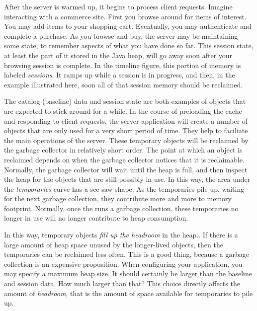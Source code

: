 After the server is warmed up, it begins to process client requests. Imagine
interacting with a commerce site. First you browse around for items of
interest. You may add items to your shopping cart. Eventually, you may
authenticate and complete a purchase. 
As you browse and buy, the server may be maintaining some
state, to remember aspects of what you have done so far. This
session state, at least the part of it stored in the Java heap, will go away
soon after your browsing session is complete. In the timeline figure, this
portion of memory is labeled \emph{sessions}. It ramps up while a session is in
progress, and then, in the example illustrated here, soon all of that session
memory should be reclaimed.

The catalog (baseline) data and session state are both examples of objects that
are expected to stick around for a while.
 In the course of preloading the cache
and responding to client requests, the server application will create a number
of objects that are only used for a very short period of time. They help to
faciliate the main operations of the server.
These temporary objects will be reclaimed by the \jres garbage collector in
relatively short order. The point at which an object is reclaimed depends on when the garbage collector
notices that it is reclaimable. Normally, the garbage collector will wait until
the heap is full, and then inspect the heap for the objects that are still
possibly in use. In this way, the area under the \emph{temporaries} curve has a
see-saw shape. As the temporaries pile up, waiting for the next garbage
collection, they contribute more and more to memory footprint. Normally, once
the \jre runs a garbage collection, these temporaries no longer in use will no
longer contribute to heap consumption.

In this way, temporary objects
\emph{fill up the headroom} in the heap.. If there is a
large amount of heap space unused by the longer-lived objects, then the
temporaries can be reclaimed less often. This is a good thing, because a
garbage collection is an expensive proposition.
  
When configuring your application, you may specify a maximum heap size. It
should certainly be larger than the baseline and session data. How much
larger than that? This choice directly affects the amount of \emph{headroom},
 that is the amount of space available for temporaries to pile up.

